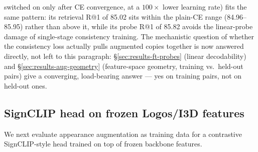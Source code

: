 switched on only after CE convergence, at a $100\times$ lower learning
rate) fits the same pattern: its retrieval R@1 of 85.02 sits within the
plain-CE range (84.96--85.95) rather than above it, while its probe R@1
of 85.82 avoids the linear-probe damage of single-stage consistency
training. 
The mechanistic question of whether the consistency loss actually pulls
augmented copies together is now answered directly, not left to this
paragraph: \S\ref{sec:results-ft-probes} (linear decodability) and
\S\ref{sec:results-aug-geometry} (feature-space geometry, training vs.\
held-out pairs) give a converging, load-bearing answer --- yes on training
pairs, not on held-out ones.

\subsection{SignCLIP head on frozen Logos/I3D features}
We next evaluate appearance augmentation as training data for a
contrastive SignCLIP-style head trained on top of frozen backbone features.

